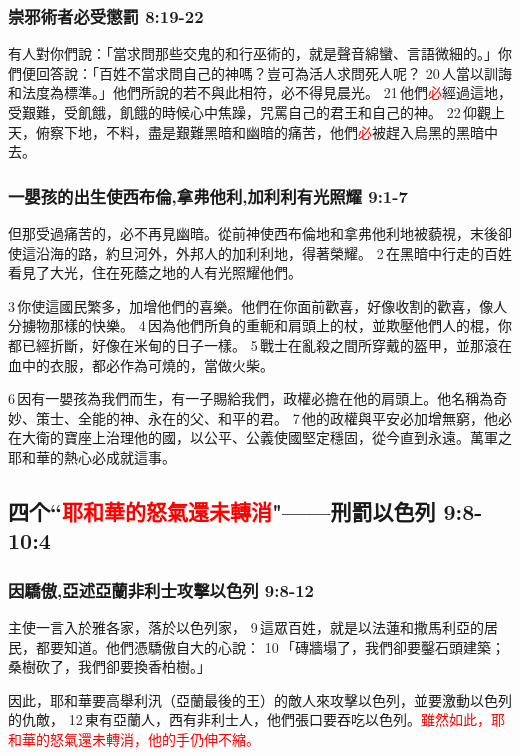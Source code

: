 \subsubsection{崇邪術者必受懲罰 8:19-22}
有人對你們說：「當求問那些交鬼的和行巫術的，就是聲音綿蠻、言語微細的。」你們便回答說：「百姓不當求問自己的神嗎？豈可為活人求問死人呢？ 20 人當以訓誨和法度為標準。」他們所說的若不與此相符，必不得見晨光。 21 他們\textcolor{red}{必}經過這地，受艱難，受飢餓，飢餓的時候心中焦躁，咒罵自己的君王和自己的神。 22 仰觀上天，俯察下地，不料，盡是艱難黑暗和幽暗的痛苦，他們\textcolor{red}{必}被趕入烏黑的黑暗中去。


\subsubsection{一嬰孩的出生使西布倫,拿弗他利,加利利有光照耀 9:1-7}
但那受過痛苦的，必不再見幽暗。從前神使西布倫地和拿弗他利地被藐視，末後卻使這沿海的路，約旦河外，外邦人的加利利地，得著榮耀。 2 在黑暗中行走的百姓看見了大光，住在死蔭之地的人有光照耀他們。 

3 你使這國民繁多，加增他們的喜樂。他們在你面前歡喜，好像收割的歡喜，像人分擄物那樣的快樂。 4 因為他們所負的重軛和肩頭上的杖，並欺壓他們人的棍，你都已經折斷，好像在米甸的日子一樣。 5 戰士在亂殺之間所穿戴的盔甲，並那滾在血中的衣服，都必作為可燒的，當做火柴。 

6 因有一嬰孩為我們而生，有一子賜給我們，政權必擔在他的肩頭上。他名稱為奇妙、策士、全能的神、永在的父、和平的君。 7 他的政權與平安必加增無窮，他必在大衛的寶座上治理他的國，以公平、公義使國堅定穩固，從今直到永遠。萬軍之耶和華的熱心必成就這事。

\subsection{四个“\textcolor{red}{耶和華的怒氣還未轉消}"——刑罰以色列 9:8-10:4}
\subsubsection{因驕傲,亞述亞蘭非利士攻擊以色列 9:8-12}
主使一言入於雅各家，落於以色列家， 9 這眾百姓，就是以法蓮和撒馬利亞的居民，都要知道。他們憑驕傲自大的心說： 10 「磚牆塌了，我們卻要鑿石頭建築；桑樹砍了，我們卻要換香柏樹。」 

因此，耶和華要高舉利汛（亞蘭最後的王）的敵人來攻擊以色列，並要激動以色列的仇敵， 12 東有亞蘭人，西有非利士人，他們張口要吞吃以色列。\textcolor{red}{雖然如此，耶和華的怒氣還未轉消，他的手仍伸不縮。}

